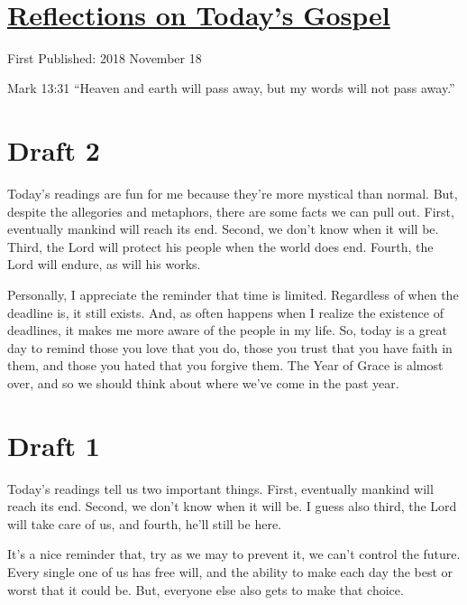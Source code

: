 \documentclass[12pt]{article}[titlepage]
\newcommand{\say}[1]{``#1''}
\newcommand{\1}{\={a}}
\newcommand{\2}{\={e}}
\newcommand{\3}{\={\i}}
\newcommand{\4}{\=o}
\newcommand{\5}{\=u}
\newcommand{\6}{\={A}}
\renewcommand{\,}{\textsuperscript{,}}
\begin{document}

\doublespacing
\section{\href{reflections-on-readings-33-ordinary-b.html}{Reflections on Today's Gospel}}
First Published: 2018 November 18

Mark 13:31 \say{Heaven and earth will pass away, but my words will not pass away.}
\section{Draft 2}
Today's readings are fun for me because they're more mystical than normal.
But, despite the allegories and metaphors, there are some facts we can pull out.
First, eventually mankind will reach its end.
Second, we don't know when it will be.
Third, the Lord will protect his people when the world does end.
Fourth, the Lord will endure, as will his works.

Personally, I appreciate the reminder that time is limited.
Regardless of when the deadline is, it still exists.
And, as often happens when I realize the existence of deadlines, it makes me more aware of the people in my life.
So, today is a great day to remind those you love that you do, those you trust that you have faith in them, and those you hated that you forgive them.
The Year of Grace is almost over, and so we should think about where we've come in the past year.

\section{Draft 1}
Today's readings tell us two important things.
First, eventually mankind will reach its end.
Second, we don't know when it will be.
I guess also third, the Lord will take care of us, and fourth, he'll still be here.

It's a nice reminder that, try as we may to prevent it, we can't control the future.
Every single one of us has free will, and the ability to make each day the best or worst that it could be.
But, everyone else also gets to make that choice.
\end{document}
